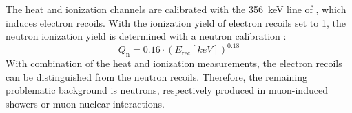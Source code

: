   The heat and ionization channels are calibrated with the \SI{356}{keV} line of , which induces electron recoils.%
  With the ionization yield of electron recoils set to 1, the neutron ionization yield is determined with a neutron calibration \cite{Dis01}:
  \begin{equation}
    Q_{\mathrm{n}}=0.16\cdot(E_{\mathrm{rec}}[\si{keV}])^{0.18}
  \end{equation}
  With combination of the heat and ionization measurements, the electron recoils can be distinguished from the neutron recoils. Therefore, the remaining problematic background is neutrons, respectively produced in muon-induced showers or muon-nuclear interactions.
